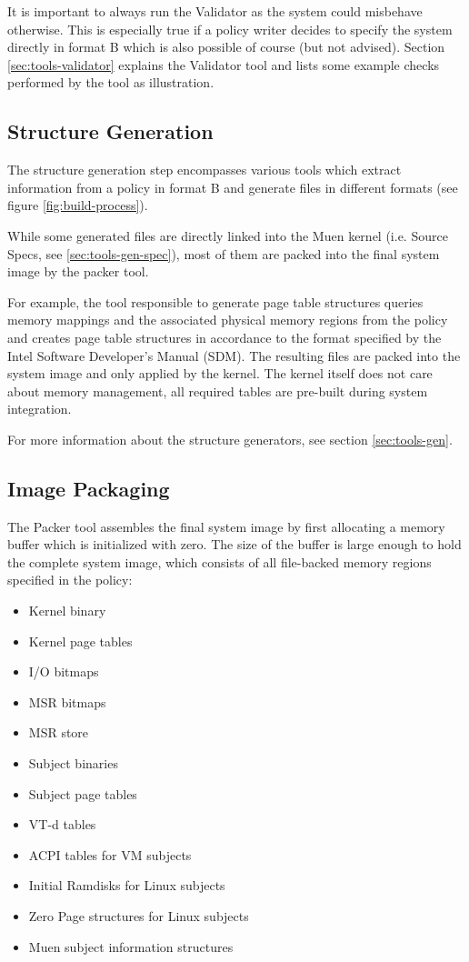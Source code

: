 \documentclass[a4paper,twoside,titlepage]{article}
\begin{document}
It is important to always run the Validator as the system could misbehave
otherwise. This is especially true if a policy writer decides to specify the
system directly in format B which is also possible of course (but not advised).
Section \ref{sec:tools-validator} explains the Validator tool and lists some
example checks performed by the tool as illustration.

\subsection{Structure Generation}
The structure generation step encompasses various tools which extract
information from a policy in format B and generate files in different formats
(see figure \ref{fig:build-process}).

While some generated files are directly linked into the Muen kernel (i.e.
Source Specs, see \ref{sec:tools-gen-spec}), most of them are packed into the
final system image by the packer tool.

For example, the tool responsible to generate page table structures queries
memory mappings and the associated physical memory regions from the policy and
creates page table structures in accordance to the format specified by the
Intel Software Developer's Manual (SDM). The resulting files are packed into
the system image and only applied by the kernel. The kernel itself does not
care about memory management, all required tables are pre-built during system
integration.

For more information about the structure generators, see section
\ref{sec:tools-gen}.

\subsection{Image Packaging}
The Packer tool assembles the final system image by first allocating a memory
buffer which is initialized with zero. The size of the buffer is large enough
to hold the complete system image, which consists of all file-backed memory
regions specified in the policy:

\begin{itemize}
	\item Kernel binary
	\item Kernel page tables
	\item I/O bitmaps
	\item MSR bitmaps
	\item MSR store
	\item Subject binaries
	\item Subject page tables
	\item VT-d tables
	\item ACPI tables for VM subjects
	\item Initial Ramdisks for Linux subjects
	\item Zero Page structures for Linux subjects
	\item Muen subject information structures
\end{itemize}
\end{document}
